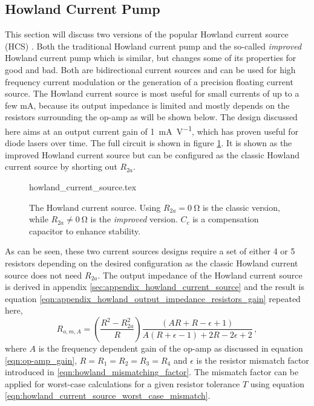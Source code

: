 \subsection{Howland Current Pump}%
\label{sec:howland_current_source}
This section will discuss two versions of the popular Howland current source (HCS) \cite{howland_current_source}. Both the traditional Howland current pump and the so-called \textit{improved} Howland current pump which is similar, but changes some of its properties for good and bad. Both are bidirectional current sources and can be used for high frequency current modulation or the generation of a precision floating current source. The Howland current source is most useful for small currents of up to a few \unit{mA}, because its output impedance is limited and mostly depends on the resistors surrounding the op-amp as will be shown below. The design discussed here aims at an output current gain of \qty{1}{\mA \per \V}, which has proven useful for diode lasers over time. The full circuit is shown in figure \ref{fig:howland_current_source}. It is shown as the improved Howland current source but can be configured as the classic Howland current source by shorting out $R_{2a}$.
\begin{figure}[ht]
    \centering
        {howland_current_source.tex}
    \caption{The Howland current source. Using $R_{2a} = \qty{0}{\ohm}$ is the classic version, while $R_{2a} \neq \qty{0}{\ohm}$ is the \textit{improved} version. $C_c$ is a compensation capacitor to enhance stability.}
    \label{fig:howland_current_source}
\end{figure}

As can be seen, these two current sources designs require a set of either \num{4} or \num{5} resistors depending on the desired configuration as the classic Howland current source does not need $R_{2a}$. The output impedance of the Howland current source is derived in appendix \ref{sec:appendix_howland_current_source} and the result is equation \ref{eqn:appendix_howland_output_impedance_resistors_gain} repeated here,
\begin{equation}
    R_{o,m,A} = \left(\frac{R^2 - R_{2a}^2}{R}\right) \frac{\left(A R + R - \epsilon + 1\right)}{A \left(R + \epsilon - 1\right) + 2 R - 2 \epsilon + 2}\,,\label{eqn:howland_output_impedance_resistors_gain}
\end{equation}
where $A$ is the frequency dependent gain of the op-amp as discussed in equation \ref{eqn:op-amp_gain}, $R = R_1 = R_2 = R_3 = R_4$ and $\epsilon$ is the resistor mismatch factor introduced in \ref{eqn:howland_mismatching_factor}. The mismatch factor can be applied for worst-case calculations for a given resistor tolerance $T$ using equation \ref{eqn:howland_current_source_worst_case_mismatch}.

